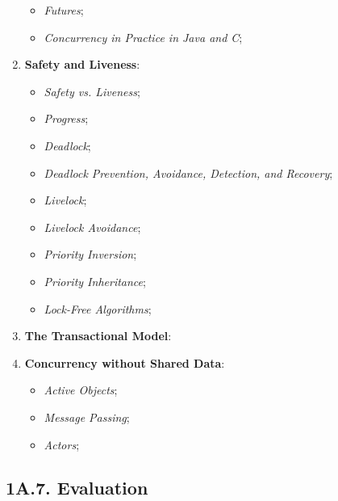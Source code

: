 \begin{enumerate}
\begin{itemize}
        \item \emph{Futures};
        \item \emph{Concurrency in Practice in Java and C};
    \end{itemize}
    \item \textbf{Safety and Liveness}:
    \begin{itemize}
        \vspace{-0.2cm}
        \item \emph{Safety vs. Liveness};
        \item \emph{Progress};
        \item \emph{Deadlock};
        \item \emph{Deadlock Prevention, Avoidance, Detection, and Recovery}; \item \emph{Livelock};
        \item \emph{Livelock Avoidance};
        \item \emph{Priority Inversion};
        \item \emph{Priority Inheritance};
        \item \emph{Lock-Free Algorithms};
    \end{itemize}
    \item \textbf{The Transactional Model}:
    \newpage
    \item \textbf{Concurrency without Shared Data}:
    \begin{itemize}
        \vspace{-0.2cm}
        \item \emph{Active Objects};
        \item \emph{Message Passing};
        \item \emph{Actors};
    \end{itemize}
\end{enumerate}

\subsection*{\large{\textbf{1A.7. Evaluation}}}
\label{ssec:lecture-1A7}

